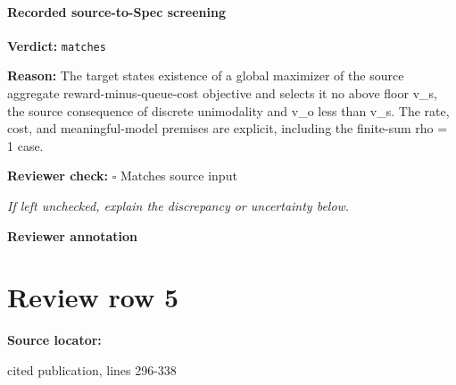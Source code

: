 \documentclass[10pt]{article}
\newcommand{\reviewerbox}{%
  \par\noindent\fbox{\parbox{0.96\linewidth}{\rule{0pt}{0.38in}}}\par
}
\newcommand{\reviewmatch}[1]{%
  \par\noindent\textbf{Reviewer check:} $\square$\; #1\par
  \noindent\emph{If left unchecked, explain the discrepancy or uncertainty below.}\par
}
\begin{document}
\paragraph{Recorded source-to-Spec screening}
\textbf{Verdict:} \texttt{matches}
\\
{\raggedright
\textbf{Reason:} The target states existence of a global maximizer of the source aggregate reward-\allowbreak{}minus-\allowbreak{}queue-\allowbreak{}cost objective and selects it no above floor v\_\allowbreak{}s, the source consequence of discrete unimodality and v\_\allowbreak{}o less than v\_\allowbreak{}s.\allowbreak{} The rate, cost, and meaningful-\allowbreak{}model premises are explicit, including the finite-\allowbreak{}sum rho = 1 case.\allowbreak{}
\par}
\reviewmatch{Matches source input}
\noindent\textbf{Reviewer annotation}\par
\reviewerbox
\clearpage
\hypertarget{source-claim-07efcbe31161050e}{}
\section*{Review row 5}
\textbf{Source locator:} {\footnotesize\raggedright cited publication, lines 296-\allowbreak{}338\par}
\end{document}
